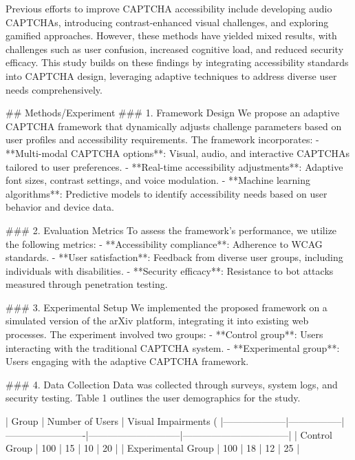 Previous efforts to improve CAPTCHA accessibility include developing audio CAPTCHAs, introducing contrast-enhanced visual challenges, and exploring gamified approaches. However, these methods have yielded mixed results, with challenges such as user confusion, increased cognitive load, and reduced security efficacy. This study builds on these findings by integrating accessibility standards into CAPTCHA design, leveraging adaptive techniques to address diverse user needs comprehensively.

## Methods/Experiment
### 1. Framework Design
We propose an adaptive CAPTCHA framework that dynamically adjusts challenge parameters based on user profiles and accessibility requirements. The framework incorporates:
- **Multi-modal CAPTCHA options**: Visual, audio, and interactive CAPTCHAs tailored to user preferences.
- **Real-time accessibility adjustments**: Adaptive font sizes, contrast settings, and voice modulation.
- **Machine learning algorithms**: Predictive models to identify accessibility needs based on user behavior and device data.

### 2. Evaluation Metrics
To assess the framework's performance, we utilize the following metrics:
- **Accessibility compliance**: Adherence to WCAG standards.
- **User satisfaction**: Feedback from diverse user groups, including individuals with disabilities.
- **Security efficacy**: Resistance to bot attacks measured through penetration testing.

### 3. Experimental Setup
We implemented the proposed framework on a simulated version of the arXiv platform, integrating it into existing web processes. The experiment involved two groups:
- **Control group**: Users interacting with the traditional CAPTCHA system.
- **Experimental group**: Users engaging with the adaptive CAPTCHA framework.

### 4. Data Collection
Data was collected through surveys, system logs, and security testing. Table 1 outlines the user demographics for the study.

| Group             | Number of Users | Visual Impairments (%
|--------------------|-----------------|-------------------------|-----------------------------|---------------------------------|
| Control Group      | 100             | 15                      | 10                          | 20                              |
| Experimental Group | 100             | 18                      | 12                          | 25                              |

